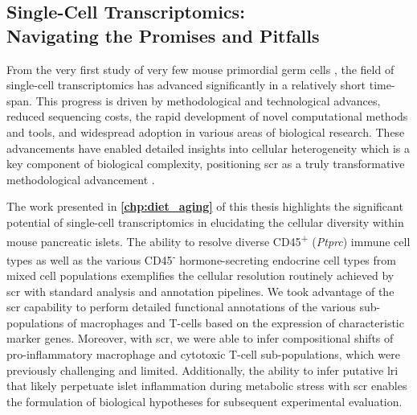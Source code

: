 

\subsection[Single-Cell Transcriptomics: Navigating the Promises and Pitfalls]{Single-Cell Transcriptomics:\\Navigating the Promises and Pitfalls}
\vspace{20pt}

\par From the very first study of very few mouse primordial germ cells \textbf{\cite{tang_mrna-seq_2009}}, the field of single-cell transcriptomics has advanced significantly in a relatively short time-span. This progress is driven by methodological and technological advances, reduced sequencing costs, the rapid development of novel computational methods and tools, and widespread adoption in various areas of biological research. These advancements have enabled detailed insights into cellular heterogeneity which is a key component of biological complexity, positioning \acrfull{scr} as a truly transformative methodological advancement \textbf{\cite{noauthor_focus_2023}}.\\

\par The work presented in \textbf{\autoref{chp:diet_aging}} of this thesis highlights the significant potential of single-cell transcriptomics in elucidating the cellular diversity within mouse pancreatic islets. The ability to resolve diverse CD45\textsuperscript{+} (\textit{Ptprc}) immune cell types as well as the various CD45\textsuperscript{-} hormone-secreting endocrine cell types from mixed cell populations exemplifies the cellular resolution routinely achieved by \gls{scr} with standard analysis and annotation pipelines. We took advantage of the \gls{scr} capability to perform detailed functional annotations of the various sub-populations of macrophages and T-cells based on the expression of characteristic marker genes. Moreover, with \gls{scr}, we were able to infer compositional shifts of pro-inflammatory macrophage and cytotoxic T-cell sub-populations, which were previously challenging and limited. Additionally, the ability to infer putative \gls{lri} that likely perpetuate islet inflammation during metabolic stress with \gls{scr} enables the formulation of biological hypotheses for subsequent experimental evaluation.\\

